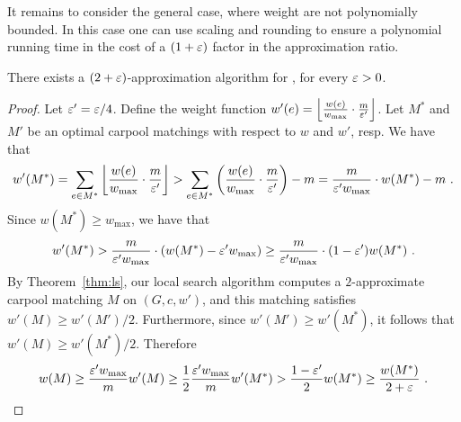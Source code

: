 It remains to consider the general case, where weight are not
polynomially bounded.  In this case one can use scaling and rounding
to ensure a polynomial running time in the cost of a $(1+\varepsilon)$ factor
in the approximation ratio.

\begin{theorem}
There exists a $(2+\varepsilon)$-approximation algorithm for \carpool, for
every $\varepsilon > 0$.
\end{theorem}
\begin{proof}
Let $\varepsilon' = \varepsilon/4$.
%
Define the weight function $w'(e)
= \left\lfloor \frac{w(e)}{w_{\max}} \cdot \frac{m}{\varepsilon'} \right\rfloor$.
%
Let $M^*$ and $M'$ be an optimal carpool matchings with respect to $w$
and $w'$, resp.  We have that
\[
w'(M^*)
=    \sum_{e \in M^*} \left\lfloor \frac{w(e)}{w_{\max}} \cdot \frac{m}{\varepsilon'} \right\rfloor
>    \sum_{e \in M^*} \left(  \frac{w(e)}{w_{\max}} \cdot \frac{m}{\varepsilon'}  \right) - m
=    \frac{m}{\varepsilon' w_{\max}} \cdot w(M^*) - m
~.
\]
Since $w(M^*) \geq w_{\max}$, we have that 
\[
w'(M^*)
>    \frac{m}{\varepsilon' w_{\max}} \cdot (w(M^*) - \varepsilon' w_{\max})
\geq \frac{m}{\varepsilon' w_{\max}} \cdot (1-\varepsilon') w(M^*)
~.
\]
By Theorem~\ref{thm:ls}, our local search algorithm computes a
$2$-approximate carpool matching $M$ on $(G, c, w')$, and this
matching satisfies $w'(M) \geq w'(M')/2$.  Furthermore, since
$w'(M') \geq w'(M^*)$, it follows that $w'(M) \geq w'(M^*)/2$.
Therefore
\[
w(M)
\geq \frac{\varepsilon' w_{\max}}{m} w'(M) 
\geq \frac{1}{2} \frac{\varepsilon' w_{\max}}{m} w'(M^*)
>    \frac{1-\varepsilon'}{2} w(M^*)
\geq \frac{w(M^*)}{2+\varepsilon}
~.
\]
\end{proof}